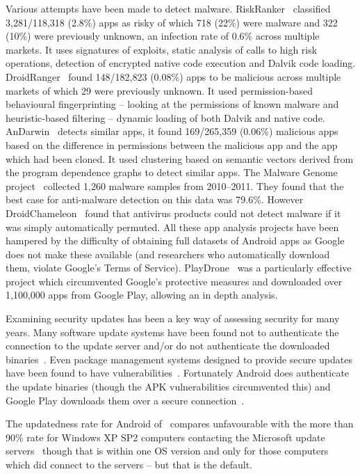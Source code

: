 \documentclass[conference,a4paper,twoside]{IEEEtran}
\begin{document}
Various attempts have been made to detect malware.
RiskRanker~\cite{Grace2012a} classified 3,281/118,318 (2.8\%) apps as risky of which 718 (22\%) were malware and 322 (10\%) were previously unknown, an infection rate of 0.6\% across multiple markets. It uses signatures of exploits, static analysis of calls to high risk operations, detection of encrypted native code execution and Dalvik code loading.
DroidRanger~\cite{Zhou2012a} found 148/182,823 (0.08\%) apps to be malicious across multiple markets of which 29 were previously unknown.
It used permission-based behavioural fingerprinting -- looking at the permissions of known malware and heuristic-based filtering -- dynamic loading of both Dalvik and native code.
AnDarwin~\cite{Crussell2013} detects similar apps, it found 169/265,359 (0.06\%) malicious apps based on the difference in permissions between the malicious app and the app which had been cloned.
It used clustering based on semantic vectors derived from the program dependence graphs to detect similar apps.
The Malware Genome project~\cite{Zhou2012b} collected 1,260 malware samples from 2010--2011.
They found that the best case for anti-malware detection on this data was 79.6\%.
However DroidChameleon~\cite{Rastogi2013} found that antivirus products could not detect malware if it was simply automatically permuted.
All these app analysis projects have been hampered by the difficulty of obtaining full datasets of Android apps as Google does not make these available (and researchers who automatically download them, violate Google's Terms of Service).
PlayDrone~\cite{Viennot2014} was a particularly effective project which circumvented Google's protective measures and downloaded over 1,100,000 apps from Google Play, allowing an in depth analysis.

Examining security updates has been a key way of assessing security for many years.
Many software update systems have been found not to authenticate the connection to the update server and/or do not authenticate the downloaded binaries~\cite{Bellissimo2006}.
Even package management systems designed to provide secure updates have been found to have vulnerabilities~\cite{Cappos2008}.
Fortunately Android does authenticate the update binaries (though the APK vulnerabilities circumvented this) and Google Play downloads them over a secure connection~\cite{Viennot2014}. %

The updatedness rate for Android of \daUpdatednessPerc\ compares unfavourable with the more than 90\% rate for Windows XP SP2 computers contacting the Microsoft update servers~\cite{Gkantsidis2006} though that is within one OS version and only for those computers which did connect to the servers -- but that is the default.
\end{document}
